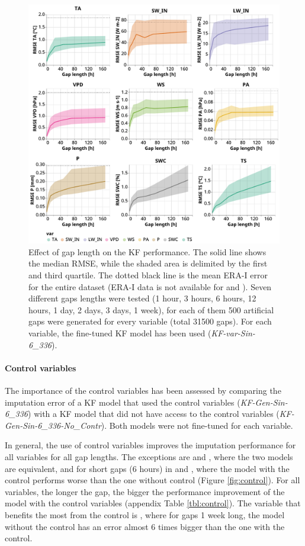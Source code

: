 \documentclass{article}
\newcommand{\imgwidth}{6in}
\begin{document}
\begin{figure}
\centerline{\includegraphics[width=\imgwidth]{gap_len}}
\caption{Effect of gap length on the KF performance. The solid line shows the median RMSE, while the shaded area is delimited by the first and third quartile. The dotted black line is the mean ERA-I error for the entire dataset (ERA-I data is not available for  and ). Seven different gaps lengths were tested (1 hour, 3 hours, 6 hours, 12 hours, 1 day, 2 days, 3 days, 1 week), for each of them 500 artificial gaps were generated for every variable (total 31500 gaps). For each variable, the fine-tuned KF model has been used (\textit{KF-\textlangle var\textrangle-Sin-6\_336}).}
\label{fig:gap_len}
\end{figure}

\paragraph{Control variables}

The importance of the control variables has been assessed by comparing the imputation error of a KF model that used the control variables (\textit{KF-Gen-Sin-6\_336}) with a KF model that did not have access to the control variables (\textit{KF-Gen-Sin-6\_336-No\_Contr}). Both models were not fine-tuned for each variable.

In general, the use of control variables improves the imputation performance for all variables for all gap lengths. The exceptions are  and , where the two models are equivalent, and for short gaps (6 hours) in  and , where the model with the control performs worse than the one without control (Figure \ref{fig:control}).
For all variables, the longer the gap, the bigger the performance improvement of the model with the control variables (appendix Table \ref{tbl:control}).
The variable that benefits the most from the control is , where for gaps 1 week long, the model without the control has an error almost 6 times bigger than the one with the control.
\end{document}
